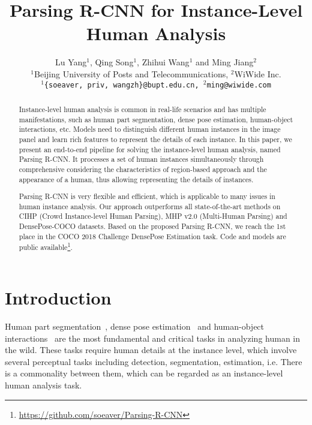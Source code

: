 \documentclass[10pt,twocolumn,letterpaper]{article}
\begin{document}
\title{Parsing R-CNN for Instance-Level Human Analysis}

\author{Lu Yang$^1$, Qing Song$^1$, Zhihui Wang$^1$ and Ming Jiang$^2$\\
$^1$Beijing University of Posts and Telecommunications, $^2$WiWide Inc.\\
{\tt\small $^1$\{soeaver, priv, wangzh\}@bupt.edu.cn, $^2$ming@wiwide.com}
}

\maketitle


\begin{abstract}
   Instance-level human analysis is common in real-life scenarios and has multiple manifestations, such as human part segmentation, dense pose estimation, human-object interactions, etc. Models need to distinguish different human instances in the image panel and learn rich features to represent the details of each instance. In this paper, we present an end-to-end pipeline for solving the instance-level human analysis, named Parsing R-CNN. It processes a set of human instances simultaneously through comprehensive considering the characteristics of region-based approach and the appearance of a human, thus allowing representing the details of instances. 
   
   Parsing R-CNN is very flexible and efficient, which is applicable to many issues in human instance analysis. Our approach outperforms all state-of-the-art methods on CIHP (Crowd Instance-level Human Parsing), MHP v2.0 (Multi-Human Parsing) and DensePose-COCO datasets. Based on the proposed Parsing R-CNN, we reach the 1st place in the COCO 2018 Challenge DensePose Estimation task. Code and models are public available\footnote{\fontsize{7pt}{1em}\url{https://github.com/soeaver/Parsing-R-CNN}}.
\end{abstract}




\section{Introduction}

Human part segmentation~\cite{Liang_tpami2018_lip, Zhao_mm2018_mhpv2, Li_mm2018_mhpm, Gong_eccv2018_pgn}, dense pose estimation~\cite{Guler_cvpr2018_densepose} and human-object interactions~\cite{Hu_cvpr2018_relation, Gkioxari_cvpr2018_interacnet, Gao_bmvc2018_ican} are the most fundamental and critical tasks in analyzing human in the wild. These tasks require human details at the instance level, which involve several perceptual tasks including detection, segmentation, estimation, i.e. There is a commonality between them, which can be regarded as an instance-level human analysis task. 
\end{document}
